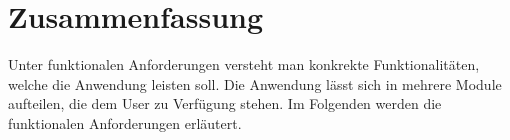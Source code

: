 %
%
%
\chapter{Zusammenfassung}
\label{cha:fazit}
%
Unter funktionalen Anforderungen versteht man konkrekte Funktionalitäten, welche die Anwendung leisten soll. Die Anwendung lässt sich in mehrere Module aufteilen, die dem User zu Verfügung stehen. Im Folgenden werden die funktionalen Anforderungen erläutert.